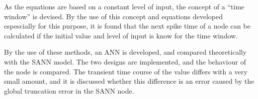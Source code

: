 As the equations are based on a constant level of input, the concept of a ``time window'' is devised.
By the use of this concept and equations developed espescially for this purpose, it is found that the next spike time of a node can be calculated if the initial value and level of input is know for the time window. %

By the use of these methods, an ANN is developed, and compared theoretically with the SANN model. %
The two designs are implemented, and the behaviour of the node is compared.
%
The transient time course of the value differs with a very small amount, and it is discussed whether this difference is an error caused by the global truncation error in the SANN node.


%
%










